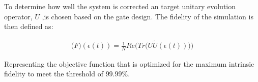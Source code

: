 \documentclass{article}
\begin{document}
To determine how well the system is corrected an target unitary evolution operator, $U$ ,is chosen based on the gate design. The fidelity of the simulation is then defined as:
\begin{center}
\begin{align}
  \mathscr(F)(\epsilon(t)) = \frac{1}{N} Re \Big(Tr \big(U\tilde{U}(\epsilon(t))\big) \Big)
\end{align}
\end{center}

Representing the objective function that is optimized for the maximum intrinsic fidelity to meet the threshold of $99.99\%$. 
\end{document}

